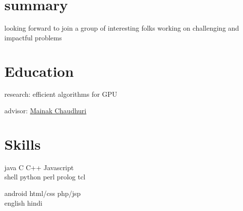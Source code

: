 
\begin{minipage}[t]{0.33\textwidth} %

\section{summary}
\location{}
looking forward to join a group of interesting folks working on challenging and impactful problems
\sectionspace %

\section{Education} 
\vspace{\topsep} %
\vspace{1pt}
\begin{tightitemize}
\item research: efficient algorithms for GPU
\item advisor: \href{https://www.cse.iitk.ac.in/users/mainakc/}{Mainak Chaudhuri} 
\end{tightitemize}
\vspace{6pt}




\sectionspace %

\section{Skills}

java \textbullet{} C \textbullet{} C++ \textbullet{} Javascript\\ 
shell \textbullet{} python \textbullet{} perl \textbullet{} prolog \textbullet{} tcl\\
\sectionspace %

android \textbullet{} html/css \textbullet{} php/jsp \\
english \textbullet{} hindi\\ 


\end{minipage}
